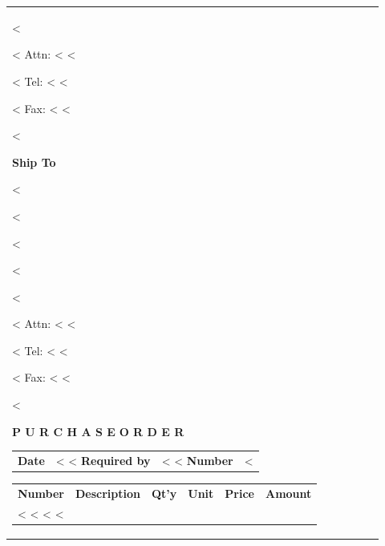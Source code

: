 \documentclass[twoside]{scrartcl}
\begin{document}
{{{\begin{tabularx}{\textwidth}{@{}lXrlrr@{}}
{<%

\vspace{0.3cm}

<%
Attn: <%
\vspace{0.3cm}
<%

<%
Tel: <%
<%

<%
Fax: <%
<%

<%
}
\parbox[t]{7.5cm}{
\textbf{Ship To}
\vspace{0.3cm}

<%

<%

<%

<%

<%

\vspace{0.3cm}

<%
Attn: <%
\vspace{0.3cm}
<%

<%
Tel: <%
<%

<%
Fax: <%
<%

<%
}
\hfill

\vspace{1cm}

\textbf{P U R C H A S E} \parbox{0.3cm}{\hfill} \textbf{O R D E R}
\hfill
\begin{tabular}[t]{l@{\hspace{0.3cm}}l}
  \textbf{Date} & <%
<%
  \textbf{Required by} & <%
<%
  \textbf{Number} & <%
\end{tabular}

\vspace{1cm}

\begin{tabularx}{\textwidth}{@{}lXrlrr@{}}
  \textbf{Number} & \textbf{Description} & \textbf{Qt'y} &
    \textbf{Unit} & \textbf{Price} & \textbf{Amount} \\
<%
  <%
    <%
<%
\end{tabularx}



\end{tabularx}}}}
\end{document}
